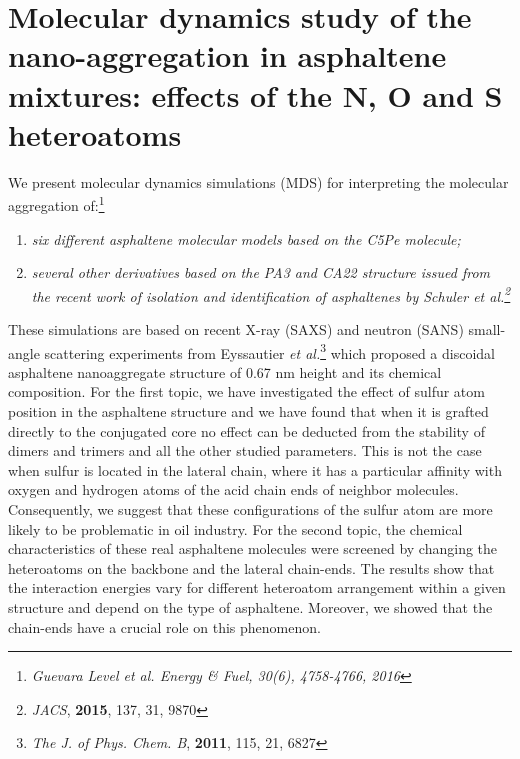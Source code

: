 \singlespacing
\chapter[Molecular dynamics study of the nano-aggregation in asphaltene]{Molecular dynamics study of the nano-aggregation in asphaltene mixtures: effects of the N, O and S heteroatoms}
\minitoc
\restoregeometry

\newpage


We present molecular dynamics simulations (MDS) for interpreting the molecular aggregation of:\footnote{\textit{Guevara Level et al. Energy \& Fuel, 30(6), 4758-4766, 2016}}
\begin{enumerate}
	\item \textit{six different asphaltene molecular models based on the C5Pe molecule;}
	\item \textit{several other derivatives based on the PA3 and CA22 structure issued from the recent work of isolation and identification of asphaltenes by Schuler \textit{et al.}\footnote{\textit{JACS}, \textbf{2015}, 137, 31, 9870}}
\end{enumerate}    

These simulations are based on recent X-ray (SAXS) and neutron (SANS) small-angle scattering experiments from Eyssautier \textit{et al.}\footnote{\textit{The J. of Phys. Chem. B}, \textbf{2011}, 115, 21, 6827} which proposed a discoidal asphaltene nanoaggregate structure of 0.67 nm height and its chemical composition. For the first topic, we have investigated the effect of sulfur atom position in the asphaltene structure and we have found that when it is grafted directly to the conjugated core no effect can be deducted from the stability of dimers and trimers and all the other studied parameters. This is not the case when sulfur is located in the lateral chain, where it has a particular affinity with oxygen and hydrogen atoms of the acid chain ends of neighbor molecules. Consequently, we suggest that these configurations of the sulfur atom are more likely to be problematic in oil industry. For the second topic, the chemical characteristics of these real asphaltene molecules were screened by changing the heteroatoms on the backbone and the lateral chain-ends. The results show that the interaction energies vary for different heteroatom arrangement within a given structure and depend on the type of asphaltene. Moreover, we showed that the chain-ends have a crucial role on this phenomenon.

\clearpage

